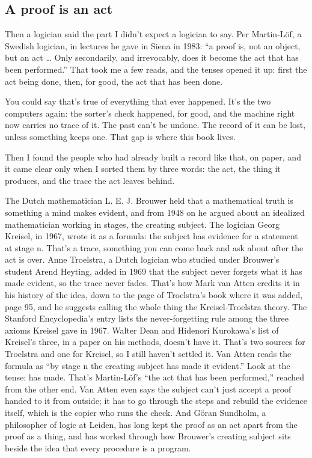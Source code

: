 \documentclass[11pt,twoside]{article}
\theoremstyle{thielethm}
\theoremstyle{thieledef}
\theoremstyle{thieledef}
\theoremstyle{thieledef}
\theoremstyle{thielethm}
\theoremstyle{thieleobs}
\theoremstyle{thielethm}
\begin{document}
\subsection{A proof is an act}

Then a logician said the part I didn't expect a logician to say. Per Martin-Löf, a Swedish logician, in lectures he gave in Siena in 1983: ``a proof is, not an object, but an act \ldots{} Only secondarily, and irrevocably, does it become the act that has been performed.'' That took me a few reads, and the tenses opened it up: first the act being done, then, for good, the act that has been done.

You could say that's true of everything that ever happened. It's the two computers again: the sorter's check happened, for good, and the machine right now carries no trace of it. The past can't be undone. The record of it can be lost, unless something keeps one. That gap is where this book lives.

Then I found the people who had already built a record like that, on paper, and it came clear only when I sorted them by three words: the act, the thing it produces, and the trace the act leaves behind.

The Dutch mathematician L. E. J. Brouwer held that a mathematical truth is something a mind makes evident, and from 1948 on he argued about an idealized mathematician working in stages, the creating subject. The logician Georg Kreisel, in 1967, wrote it as a formula: the subject has evidence for a statement at stage n. That's a trace, something you can come back and ask about after the act is over. Anne Troelstra, a Dutch logician who studied under Brouwer's student Arend Heyting, added in 1969 that the subject never forgets what it has made evident, so the trace never fades. That's how Mark van Atten credits it in his history of the idea, down to the page of Troelstra's book where it was added, page 95, and he suggests calling the whole thing the Kreisel-Troelstra theory. The Stanford Encyclopedia's entry lists the never-forgetting rule among the three axioms Kreisel gave in 1967. Walter Dean and Hidenori Kurokawa's list of Kreisel's three, in a paper on his methods, doesn't have it. That's two sources for Troelstra and one for Kreisel, so I still haven't settled it. Van Atten reads the formula as ``by stage n the creating subject has made it evident.'' Look at the tense: has made. That's Martin-Löf's ``the act that has been performed,'' reached from the other end. Van Atten even says the subject can't just accept a proof handed to it from outside; it has to go through the steps and rebuild the evidence itself, which is the copier who runs the check. And Göran Sundholm, a philosopher of logic at Leiden, has long kept the proof as an act apart from the proof as a thing, and has worked through how Brouwer's creating subject sits beside the idea that every procedure is a program.
\end{document}
